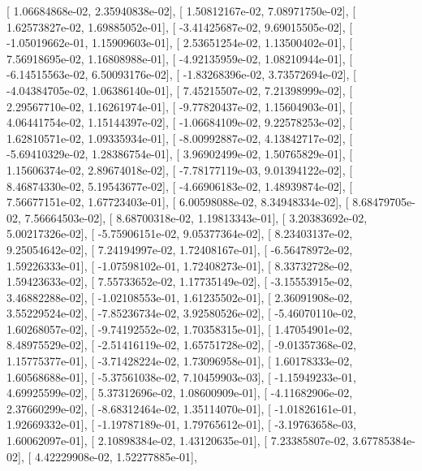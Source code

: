 \documentclass{article}
\begin{document}
       [  1.06684868e-02,   2.35940838e-02],
       [  1.50812167e-02,   7.08971750e-02],
       [  1.62573827e-02,   1.69885052e-01],
       [ -3.41425687e-02,   9.69015505e-02],
       [ -1.05019662e-01,   1.15909603e-01],
       [  2.53651254e-02,   1.13500402e-01],
       [  7.56918695e-02,   1.16808988e-01],
       [ -4.92135959e-02,   1.08210944e-01],
       [ -6.14515563e-02,   6.50093176e-02],
       [ -1.83268396e-02,   3.73572694e-02],
       [ -4.04384705e-02,   1.06386140e-01],
       [  7.45215507e-02,   7.21398999e-02],
       [  2.29567710e-02,   1.16261974e-01],
       [ -9.77820437e-02,   1.15604903e-01],
       [  4.06441754e-02,   1.15144397e-02],
       [ -1.06684109e-02,   9.22578253e-02],
       [  1.62810571e-02,   1.09335934e-01],
       [ -8.00992887e-02,   4.13842717e-02],
       [ -5.69410329e-02,   1.28386754e-01],
       [  3.96902499e-02,   1.50765829e-01],
       [  1.15606374e-02,   2.89674018e-02],
       [ -7.78177119e-03,   9.01394122e-02],
       [  8.46874330e-02,   5.19543677e-02],
       [ -4.66906183e-02,   1.48939874e-02],
       [  7.56677151e-02,   1.67723403e-01],
       [  6.00598088e-02,   8.34948334e-02],
       [  8.68479705e-02,   7.56664503e-02],
       [  8.68700318e-02,   1.19813343e-01],
       [  3.20383692e-02,   5.00217326e-02],
       [ -5.75906151e-02,   9.05377364e-02],
       [  8.23403137e-02,   9.25054642e-02],
       [  7.24194997e-02,   1.72408167e-01],
       [ -6.56478972e-02,   1.59226333e-01],
       [ -1.07598102e-01,   1.72408273e-01],
       [  8.33732728e-02,   1.59423633e-02],
       [  7.55733652e-02,   1.17735149e-02],
       [ -3.15553915e-02,   3.46882288e-02],
       [ -1.02108553e-01,   1.61235502e-01],
       [  2.36091908e-02,   3.55229524e-02],
       [ -7.85236734e-02,   3.92580526e-02],
       [ -5.46070110e-02,   1.60268057e-02],
       [ -9.74192552e-02,   1.70358315e-01],
       [  1.47054901e-02,   8.48975529e-02],
       [ -2.51416119e-02,   1.65751728e-02],
       [ -9.01357368e-02,   1.15775377e-01],
       [ -3.71428224e-02,   1.73096958e-01],
       [  1.60178333e-02,   1.60568688e-01],
       [ -5.37561038e-02,   7.10459903e-03],
       [ -1.15949233e-01,   4.69925599e-02],
       [  5.37312696e-02,   1.08600909e-01],
       [ -4.11682906e-02,   2.37660299e-02],
       [ -8.68312464e-02,   1.35114070e-01],
       [ -1.01826161e-01,   1.92669332e-01],
       [ -1.19787189e-01,   1.79765612e-01],
       [ -3.19763658e-03,   1.60062097e-01],
       [  2.10898384e-02,   1.43120635e-01],
       [  7.23385807e-02,   3.67785384e-02],
       [  4.42229908e-02,   1.52277885e-01],
\end{document}
